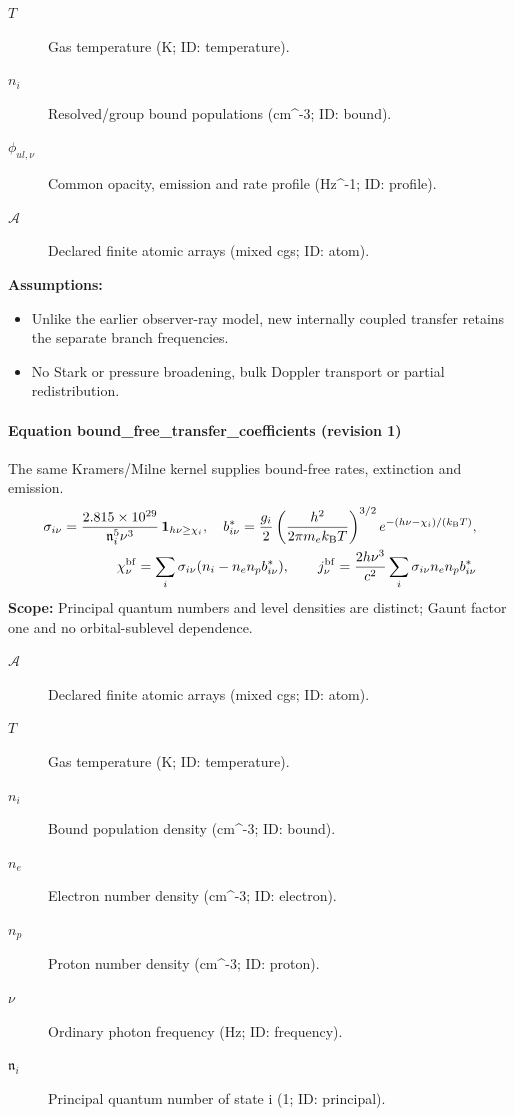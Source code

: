 \begin{description}
\item[$T$] Gas temperature (K; ID: temperature).
\item[$n_i$] Resolved/group bound populations (cm\textasciicircum{}-3; ID: bound).
\item[$\phi_{ul,\nu}$] Common opacity, emission and rate profile (Hz\textasciicircum{}-1; ID: profile).
\item[$\mathcal A$] Declared finite atomic arrays (mixed cgs; ID: atom).
\end{description}

\noindent\textbf{Assumptions:}
\begin{itemize}
\item Unlike the earlier observer-ray model, new internally coupled transfer retains the separate branch frequencies.
\item No Stark or pressure broadening, bulk Doppler transport or partial redistribution.
\end{itemize}

\paragraph{Equation bound\_free\_transfer\_coefficients (revision 1)}
The same Kramers/Milne kernel supplies bound-free rates, extinction and emission.
\begin{equation}
\begin{aligned}
\sigma_{i\nu}=\frac{2.815\times10^{29}}{\mathfrak n_i^5\nu^3}\,\mathbf1_{h\nu\ge\chi_i},\quad b^*_{i\nu}=\frac{g_i}{2}\left(\frac{h^2}{2\pi m_e k_{\rm B}T}\right)^{3/2}e^{-(h\nu-\chi_i)/(k_{\rm B}T)},\\\chi_\nu^{\rm bf}=\sum_i\sigma_{i\nu}(n_i-n_en_pb^*_{i\nu}),\qquad j_\nu^{\rm bf}=\frac{2h\nu^3}{c^2}\sum_i\sigma_{i\nu}n_en_pb^*_{i\nu}
\end{aligned}
\label{eq:escape.coupled_5f_hydrogen:bound_5f_free_5f_transfer_5f_coefficients:1}
\end{equation}
\noindent\textbf{Scope:} Principal quantum numbers and level densities are distinct; Gaunt factor one and no orbital-sublevel dependence.

\begin{description}
\item[$\mathcal A$] Declared finite atomic arrays (mixed cgs; ID: atom).
\item[$T$] Gas temperature (K; ID: temperature).
\item[$n_i$] Bound population density (cm\textasciicircum{}-3; ID: bound).
\item[$n_e$] Electron number density (cm\textasciicircum{}-3; ID: electron).
\item[$n_p$] Proton number density (cm\textasciicircum{}-3; ID: proton).
\item[$\nu$] Ordinary photon frequency (Hz; ID: frequency).
\item[$\mathfrak n_i$] Principal quantum number of state i (1; ID: principal).
\end{description}

